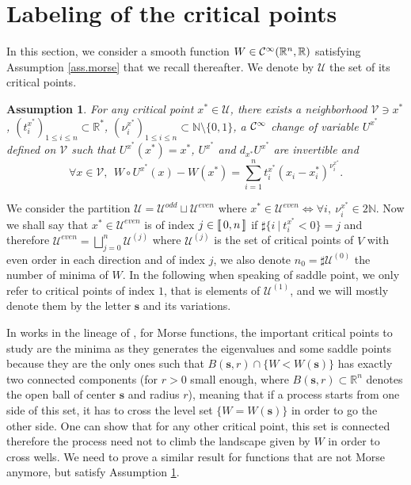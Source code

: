\documentclass[12pt]{amsart}
\newcommand{\N}{\mathbb N}
\newcommand{\R}{\mathbb R}
\numberwithin{equation}{section}
\numberwithin{figure}{section}
\def\s{\mathbf{s}}
\newcommand{\lb}{\operatorname{[\negthinspace [}}
\newcommand{\rb}{\operatorname{]\negthinspace ]}}
\newtheorem{assumption}{Assumption}
\def\uuu{{\mathcal U}}\def\vvv{{\mathcal V}}\def\www{{\mathcal W}}\def\xxx{{\mathcal X}}
\begin{document}
\appendix
\section{Labeling of the critical points}

In this section, we consider a smooth function $W\in\ccc^\infty(\R^n,\R)$ satisfying Assumption \ref{ass.morse} that we recall thereafter. We denote by $\uuu$ the set of its critical points.
\begin{assumption}\label{ass:morsedegen2}
    For any critical point $x^*\in\uuu$, there exists a neighborhood $\vvv\ni x^*$, $(t_i^{x^*})_{1\leq i\leq n}\subset \R^{*}$, $(\nu_i^{x^*})_{1\leq i\leq n}\subset \N\setminus\{0,1\}$, a ${\mathcal C}^\infty$ change of variable $U^{x^*}$ defined on $\vvv$ such that $U^{x^*}(x^*)=x^*$, $U^{x^*}$ and $d_{x^*}U^{x^*}$ are invertible and
    \begin{equation*}
    \forall x\in\vvv,\ \ W\circ U^{x^*}(x) - W(x^*) = \sum_{i=1}^nt_i^{x^*}(x_i-x_i^*)^{\nu_i^{x^*}}.
    \end{equation*}
\end{assumption}
We consider the partition $\uuu = \uuu^{odd}\sqcup\uuu^{even}$ where $x^*\in\uuu^{even} \iff \forall i,\ \nu_i^{x^*}\in 2\N$. Now we shall say that $x^*\in\uuu^{even}$ is of index $j\in\lb0,n\rb$ if $\sharp\{i\ |\ t_i^{x^*}<0\}=j$ and therefore $\uuu^{even}=\bigsqcup_{j=0}^n\uuu^{(j)}$ where $\uuu^{(j)}$ is the set of critical points of $V$ with even order in each direction and of index $j$, we also denote $n_0 = \sharp\uuu^{(0)}$ the number of minima of $W$. In the following when speaking of saddle point, we only refer to critical points of index $1$, that is elements of $\uuu^{(1)}$, and we will mostly denote them by the letter $\s$ and its variations.

In works in the lineage of \cite{BoLePMi22}, for Morse functions, the important critical points to study are the minima as they generates the eigenvalues and some saddle points because they are the only ones such that $B(\s,r)\cap\{W < W(\s)\}$ has exactly two connected components (for $r>0$ small enough, where $B(\s,r)\subset\R^n$ denotes the open ball of center $\s$ and radius $r$), meaning that if a process starts from one side of this set, it has to cross the level set $\{W = W(\s)\}$ in order to go the other side. One can show that for any other critical point, this set is connected therefore the process need not to climb the landscape given by $W$ in order to cross wells. We need to prove a similar result for functions that are not Morse anymore, but satisfy Assumption \ref{ass:morsedegen2}.
\end{document}
